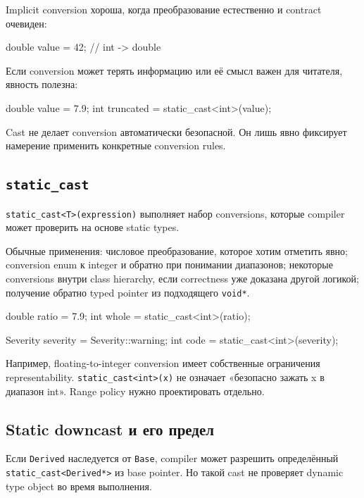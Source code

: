 Implicit conversion хороша, когда преобразование естественно и contract
очевиден:

\begin{cppcode}
double value = 42; // int -> double
\end{cppcode}

Если conversion может терять информацию или её смысл важен для читателя,
явность полезна:

\begin{cppcode}
double value = 7.9;
int truncated = static_cast<int>(value);
\end{cppcode}

Cast не делает conversion автоматически безопасной. Он лишь явно фиксирует
намерение применить конкретные conversion rules.

\subsection{\texttt{static\_cast}}

\texttt{static\_cast<T>(expression)} выполняет набор conversions, которые
compiler может проверить на основе static types.

Обычные применения:
числовое преобразование, которое хотим отметить явно; conversion enum к integer и обратно при понимании диапазонов; некоторые conversions внутри class hierarchy, если correctness уже доказана другой логикой; получение обратно typed pointer из подходящего \texttt{void*}.

\begin{cppcode}
double ratio = 7.9;
int whole = static_cast<int>(ratio);

Severity severity = Severity::warning;
int code = static_cast<int>(severity);
\end{cppcode}

\begin{warningbox}
Например, floating-to-integer conversion имеет собственные ограничения
representability. \texttt{static\_cast<int>(x)} не означает
«безопасно зажать x в диапазон int». Range policy нужно проектировать отдельно.
\end{warningbox}

\subsection{Static downcast и его предел}

Если \texttt{Derived} наследуется от \texttt{Base}, compiler может разрешить
определённый \texttt{static\_cast<Derived*>} из base pointer. Но такой cast не
проверяет dynamic type object во время выполнения.


